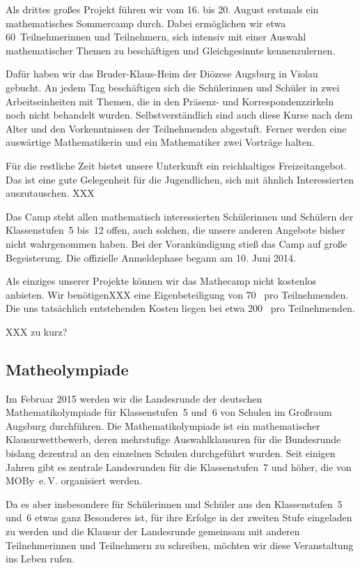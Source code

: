 \documentclass[12pt]{zettel}
\begin{document}
Als drittes großes Projekt führen wir vom 16. bis 20. August erstmals ein
mathematisches Sommercamp durch. Dabei ermöglichen wir etwa 60~Teilnehmerinnen
und Teilnehmern, sich intensiv mit einer Auswahl mathematischer Themen zu
beschäftigen und Gleichgesinnte kennenzulernen.

Dafür haben wir das Bruder-Klaus-Heim der Diözese Augsburg in Violau
gebucht. An jedem Tag beschäftigen sich die Schülerinnen und Schüler in zwei
Arbeitseinheiten mit Themen, die in den Präsenz- und Korrespondenzzirkeln noch
nicht behandelt wurden. Selbstverständlich sind auch diese Kurse nach dem Alter
und den Vorkenntnissen der Teilnehmenden abgestuft. Ferner
werden eine auswärtige Mathematikerin und ein Mathematiker zwei Vorträge halten.

Für die restliche Zeit bietet unsere Unterkunft ein reichhaltiges
Freizeitangebot. Das ist eine gute Gelegenheit für die Jugendlichen,
sich mit ähnlich Interessierten auszutauschen. XXX

Das Camp steht allen mathematisch interessierten Schülerinnen und Schülern der
Klassenstufen~5 bis~12 offen, auch solchen, die unsere anderen Angebote bisher
nicht wahrgenommen haben. Bei der Vorankündigung stieß das Camp auf große
Begeisterung. Die offizielle Anmeldephase begann am 10. Juni 2014.

Als einziges unserer Projekte können wir das Mathecamp nicht kostenlos
anbieten. Wir benötigenXXX eine Eigenbeteiligung von 70~\texteuro{} pro
Teilnehmenden. Die uns tatsächlich entstehenden Kosten liegen bei etwa
200~\texteuro{} pro Teilnehmenden.

XXX zu kurz?


\subsection{Matheolympiade}

Im Februar 2015 werden wir die Landesrunde der deutschen
Mathematikolympiade für Klassenstufen~5 und~6 von Schulen im Großraum
Augsburg durchführen. Die Mathematikolympiade ist ein mathematischer
Klausurwettbewerb, deren mehrstufige Auswahlklausuren für die Bundesrunde
bislang dezentral an den einzelnen Schulen durchgeführt wurden. Seit einigen
Jahren gibt es zentrale Landesrunden für die Klassenstufen~7 und höher, die von
MOBy~e.\,V. organisiert werden.

Da es aber insbesondere für Schülerinnen und Schüler aus den Klassenstufen~5
und~6 etwas ganz Besonderes ist, für ihre Erfolge in der zweiten Stufe
eingeladen zu werden und die Klausur der Landesrunde gemeinsam mit anderen
Teilnehmerinnen und Teilnehmern zu schreiben, möchten wir diese Veranstaltung
ins Leben rufen.
\end{document}
